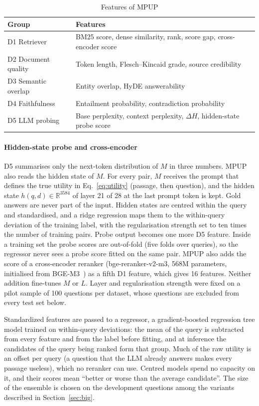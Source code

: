 \documentclass[conference]{IEEEtran}
\begin{document}
\begin{table}[htbp]
    \centering
    \caption{Features of MPUP}
    \label{tab:mpup_features}
    \begin{tabularx}{\columnwidth}{lX}
        \toprule
        \textbf{Group} & \textbf{Features} \\
        \midrule
        D1 Retriever & BM25 score, dense similarity, rank, score gap, cross-encoder score \\
        D2 Document quality & Token length, Flesch--Kincaid grade, source credibility \\
        D3 Semantic overlap & Entity overlap, HyDE answerability \\
        D4 Faithfulness & Entailment probability, contradiction probability \\
        D5 LLM probing & Base perplexity, context perplexity, $\Delta H$, hidden-state probe score \\
        \bottomrule
    \end{tabularx}
\end{table}

\paragraph{Hidden-state probe and cross-encoder} D5 summarises only the next-token distribution of $M$ in three numbers. MPUP also reads the hidden state of $M$. For every pair, $M$ receives the prompt that defines the true utility in Eq.~\eqref{eq:utility} (passage, then question), and the hidden state $h(q,d)\in\mathbb{R}^{3584}$ of layer 21 of 28 at the last prompt token is kept. Gold answers are never part of the input. Hidden states are centred within the query and standardised, and a ridge regression maps them to the within-query deviation of the training label, with the regularisation strength set to ten times the number of training pairs. Probe output becomes one more D5 feature. Inside a training set the probe scores are out-of-fold (five folds over queries), so the regressor never sees a probe score fitted on the same pair. MPUP also adds the score of a cross-encoder reranker (bge-reranker-v2-m3, 568M parameters, initialised from BGE-M3~\cite{chen2024m3}) as a fifth D1 feature, which gives 16 features. Neither addition fine-tunes $M$ or $L$. Layer and regularisation strength were fixed on a pilot sample of 100 questions per dataset, whose questions are excluded from every test set below.

Standardized features are passed to a regressor, a gradient-boosted regression tree model trained on within-query deviations: the
mean of the query is subtracted from every feature and from the label
before fitting, and at inference the candidates of the query being ranked
form that group. Much of the raw utility is an offset per query
(a question that the LLM already answers makes every passage useless),
which no reranker can use. Centred models spend no capacity on it, and their scores mean ``better or worse than the average candidate''. The
size of the ensemble is chosen on the development questions among the variants described in Section~\ref{sec:big}.
\end{document}
